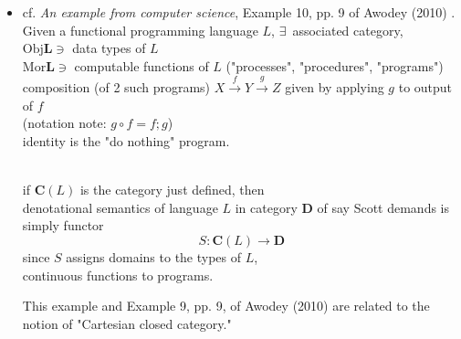 \documentclass[10pt]{amsart}
\begin{document}
\begin{multicols*}{2}
\begin{itemize}
\begin{itemize}
	\item cf. Ch. 1, Example 8, pp. 9, Awodey (2010) \cite{Awod2010}.
	$\textbf{Pos}$ categories and functors: functor $F: \mathbf{D} \to \mathbf{Q}$ between poset categories $\mathbf{P}, \mathbf{Q}$. \\
	They are the monotone functions.
	\begin{proof} 
	Consider 
	\[
	F : \text{Hom}_{\mathbf{P}}(A,B) \to \text{Hom}_{\mathbf{Q}}(F(A), F(B))
	\]
	$f\in \text{Hom}_{\mathbf{P}}(A,B)$ so if $a\leq_A a'$, $f(a) \leq_B f(a')$
	
	Let $g\in \text{Hom}_{\mathbf{Q}}(F(A), F(B))$, so if $c\leq_{F(A)} c'$, $g(c)\leq_{F(B)} g(c')$. \\
	
	$F(f) \in \text{Hom}_{\mathbf{Q}}(F(A), F(B))$ (by definition of a functor), so if $c\leq_{F(A)} c'$, $F(f)(c) \leq_{F(B)} F(f)(c')$ or $F(f(c)) \leq_{F(B)} F(f(c'))$. \\
	
	So $F$ itself is monotone.
	\end{proof}
\end{itemize}
\item cf. \emph{An example from computer science}, Example 10, pp. 9 of Awodey (2010) \cite{Awod2010}.
Given a functional programming language $L$, $\exists \, $ associated category, \\
$\text{Obj}\mathbf{L} \ni $ data types of $L$ \\
$\text{Mor}\mathbf{L} \ni $ computable functions of $L$ ("processes", "procedures", "programs") \\
composition (of 2 such programs) $X \xrightarrow{f} Y \xrightarrow{g} Z$ given by applying $g$ to output of $f$ \\
(notation note: $g\circ f = f; g$) \\
identity is the "do nothing" program. 

\quad \\
if $\mathbf{C}(L)$ is the category just defined, then \\
denotational semantics of language $L$ in category $\mathbf{D}$ of say Scott demands is simply functor
\[
S:\mathbf{C}(L) \to \mathbf{D} 
\]
since $S$ assigns domains to the types of $L$, \\
continuous functions to programs.

This example and Example 9, pp. 9, of Awodey (2010) \cite{Awod2010} are related to the notion of "Cartesian closed category."


\end{itemize}
\end{multicols*}
\end{document}
